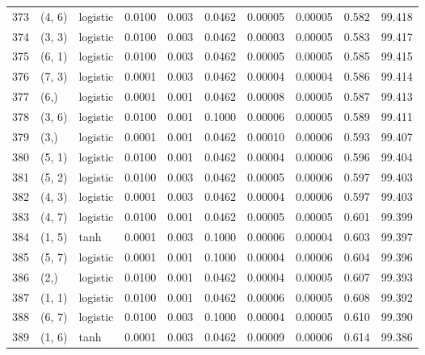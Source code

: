\begin{tabular}{lllrrrrrrr}
373 &      (4, 6) &  logistic &  0.0100 &  0.003 &  0.0462 &          0.00005 &    0.00005 &       0.582 &    99.418 \\
374 &      (3, 3) &  logistic &  0.0100 &  0.003 &  0.0462 &          0.00003 &    0.00005 &       0.583 &    99.417 \\
375 &      (6, 1) &  logistic &  0.0100 &  0.003 &  0.0462 &          0.00005 &    0.00005 &       0.585 &    99.415 \\
376 &      (7, 3) &  logistic &  0.0001 &  0.003 &  0.0462 &          0.00004 &    0.00004 &       0.586 &    99.414 \\
377 &        (6,) &  logistic &  0.0001 &  0.001 &  0.0462 &          0.00008 &    0.00005 &       0.587 &    99.413 \\
378 &      (3, 6) &  logistic &  0.0100 &  0.001 &  0.1000 &          0.00006 &    0.00005 &       0.589 &    99.411 \\
379 &        (3,) &  logistic &  0.0001 &  0.001 &  0.0462 &          0.00010 &    0.00006 &       0.593 &    99.407 \\
380 &      (5, 1) &  logistic &  0.0100 &  0.001 &  0.0462 &          0.00004 &    0.00006 &       0.596 &    99.404 \\
381 &      (5, 2) &  logistic &  0.0100 &  0.003 &  0.0462 &          0.00005 &    0.00006 &       0.597 &    99.403 \\
382 &      (4, 3) &  logistic &  0.0001 &  0.003 &  0.0462 &          0.00004 &    0.00006 &       0.597 &    99.403 \\
383 &      (4, 7) &  logistic &  0.0100 &  0.001 &  0.0462 &          0.00005 &    0.00005 &       0.601 &    99.399 \\
384 &      (1, 5) &      tanh &  0.0001 &  0.003 &  0.1000 &          0.00006 &    0.00004 &       0.603 &    99.397 \\
385 &      (5, 7) &  logistic &  0.0001 &  0.001 &  0.1000 &          0.00004 &    0.00006 &       0.604 &    99.396 \\
386 &        (2,) &  logistic &  0.0100 &  0.001 &  0.0462 &          0.00004 &    0.00005 &       0.607 &    99.393 \\
387 &      (1, 1) &  logistic &  0.0100 &  0.001 &  0.0462 &          0.00006 &    0.00005 &       0.608 &    99.392 \\
388 &      (6, 7) &  logistic &  0.0100 &  0.003 &  0.1000 &          0.00004 &    0.00005 &       0.610 &    99.390 \\
389 &      (1, 6) &      tanh &  0.0001 &  0.003 &  0.0462 &          0.00009 &    0.00006 &       0.614 &    99.386 \\

\end{tabular}
